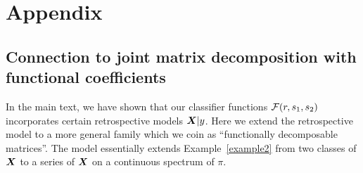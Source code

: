 \documentclass[11pt]{article}
\theoremstyle{plain}
\theoremstyle{definition}
\begin{document}
\section*{Appendix}
\renewcommand{\thesubsection}{\Alph{subsection}}
\setcounter{figure}{0}
\setcounter{table}{0}
\renewcommand{\thetable}{S\arabic{table}}
\renewcommand{\thefigure}{S\arabic{figure}}
\renewcommand{\figurename}{Supplemental Figure}
\renewcommand{\tablename}{Supplemental Table}


\subsection{Connection to joint matrix decomposition with functional coefficients}\label{sec:joint}
In the main text, we have shown that our classifier functions $\mathcal{F}(r,s_1,s_2)$ incorporates certain retrospective models $\bm X|y$. Here we extend the retrospective model to a more general family  which we coin as ``functionally decomposable matrices''. The model essentially extends Example~\ref{example2} from two classes of $\bm X$ to a series of $\bm X$ on a continuous spectrum of $\pi$. 
\end{document}
